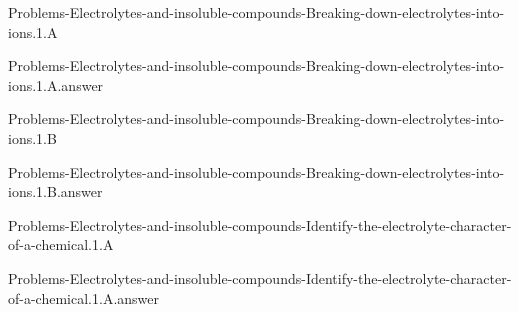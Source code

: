 \documentclass[main.tex]{subfiles}
\newcommand\chapterlabel{}
\begin{document}
\renewcommand\chapterlabel{Ch-electrolytes}
\begin{question}[ID=\the\value{numA}]
{Problems-Electrolytes-and-insoluble-compounds-Breaking-down-electrolytes-into-ions.1.A}
\end{question}
   \begin{Form}
   \TextField[multiline,backgroundcolor=gray!20,borderwidth=0,width=0.43\textwidth  ,height=115pt, name=\the\value{numA}]  { }\end{Form}
\begin{solution}
{Problems-Electrolytes-and-insoluble-compounds-Breaking-down-electrolytes-into-ions.1.A.answer}
\hspace{0.1cm}
\end{solution}


\renewcommand\chapterlabel{Ch-electrolytes}
\begin{question}[ID=\the\value{numA}]
{Problems-Electrolytes-and-insoluble-compounds-Breaking-down-electrolytes-into-ions.1.B}
\end{question}
   \begin{Form}
   \TextField[multiline,backgroundcolor=gray!20,borderwidth=0,width=0.43\textwidth  ,height=115pt, name=\the\value{numA}]  { }\end{Form}
\begin{solution}
{Problems-Electrolytes-and-insoluble-compounds-Breaking-down-electrolytes-into-ions.1.B.answer}
\hspace{0.1cm}
\end{solution}


\renewcommand\chapterlabel{Ch-electrolytes}
\begin{question}[ID=\the\value{numA}]
{Problems-Electrolytes-and-insoluble-compounds-Identify-the-electrolyte-character-of-a-chemical.1.A}
\end{question}
   \begin{Form}
   \TextField[multiline,backgroundcolor=gray!20,borderwidth=0,width=0.43\textwidth  ,height=115pt, name=\the\value{numA}]  { }\end{Form}
\begin{solution}
{Problems-Electrolytes-and-insoluble-compounds-Identify-the-electrolyte-character-of-a-chemical.1.A.answer}
\hspace{0.1cm}
\end{solution}
\end{document}
